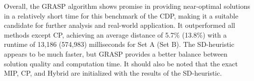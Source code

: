 \documentclass{article}
\begin{document}
\begin{table}[htbp]
    \centering
    \caption{Performance of the GRASP heuristic on the CDP benchmark instances}
    \label{tab:cdp_instances}
    \scriptsize
\end{table}

Overall, the GRASP algorithm shows promise in providing near-optimal solutions in a relatively short time for this benchmark of the CDP, making it a suitable candidate for further analysis and real-world application. It outperformed all methods except CP, achieving an average distance of 5.7\% (13.8\%) with a runtime of 13,186 (574,983) milliseconds for Set A (Set B). The SD-heuristic appears to be much faster, but GRASP provides a better balance between solution quality and computation time. It should also be noted that the exact MIP, CP, and Hybrid are initialized with the results of the SD-heuristic.
\end{document}
